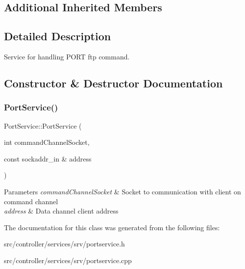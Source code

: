 \subsection*{Additional Inherited Members}


\subsection{Detailed Description}
Service for handling P\+O\+RT ftp command. 

\subsection{Constructor \& Destructor Documentation}
\mbox{\label{classPortService_aba5f1db162126817510cd4f178eb4d57}} 
\subsubsection{\texorpdfstring{Port\+Service()}{PortService()}}
{\footnotesize\ttfamily Port\+Service\+::\+Port\+Service (\begin{DoxyParamCaption}\item[{int}]{command\+Channel\+Socket,  }\item[{const sockaddr\+\_\+in \&}]{address }\end{DoxyParamCaption})}


\begin{DoxyParams}{Parameters}
{\em command\+Channel\+Socket} & Socket to communication with client on command channel \\
\hline
{\em address} & Data channel client address \\
\hline
\end{DoxyParams}


The documentation for this class was generated from the following files\+:\begin{DoxyCompactItemize}
\item 
src/controller/services/srv/portservice.\+h\item 
src/controller/services/srv/portservice.\+cpp\end{DoxyCompactItemize}

